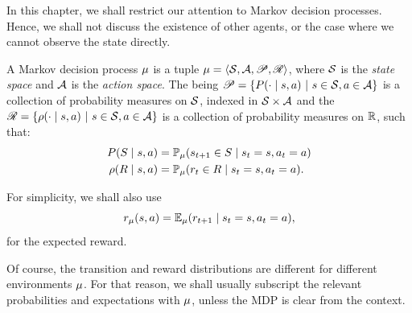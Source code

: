 In this chapter, we shall restrict our attention to Markov decision processes. Hence, we shall not discuss the existence of other agents, or the case where we cannot observe the state directly. 
\begin{definition}
  A Markov decision process $\mu$ is a tuple $\mu = \left\langle {\mathcal{S}}, {\mathcal{A}}, \mathscr{P}, \mathscr{R}\right\rangle$, where ${\mathcal{S}}$ is the \emph{state space} and ${\mathcal{A}}$ is the \emph{action space}. The  being $\mathscr{P} = \left\{P(\cdot \mid s,a) ~\middle|~ s \in {\mathcal{S}}, a \in {\mathcal{A}}\right\}$ is a collection of probability measures on ${\mathcal{S}}$, indexed in ${\mathcal{S}} \times {\mathcal{A}}$ and the   $\mathscr{R} = \left\{\rho(\cdot \mid s,a) ~\middle|~ s \in {\mathcal{S}}, a \in {\mathcal{A}}\right\}$ is a collection of probability measures on ${\mathbb{R}}$, such that:  
  \begin{align}
    P(S \mid s, a) &= \mathop{\mbox{\ensuremath{\mathbb{P}}}}\nolimits_\mu(s_{t+1} \in S \mid s_t =s, a_t = a)
    \\
    \rho(R \mid s, a) &= \mathop{\mbox{\ensuremath{\mathbb{P}}}}\nolimits_\mu(r_{t} \in R \mid s_t =s, a_t = a).
  \end{align}
  \label{def:MDP}
\end{definition}
For simplicity, we shall also use
\begin{equation}
  \label{eq:expected-reward}
  r_\mu(s,a) = \mathop{\mbox{\ensuremath{\mathbb{E}}}}\nolimits_\mu(r_{t+1} \mid s_t = s, a_t = a),
\end{equation}
for the expected reward.

Of course, the transition and reward distributions are different
for different environments $\mu$. For that reason, we shall
usually subscript the relevant probabilities and expectations with
$\mu$, unless the MDP is clear from the context.


